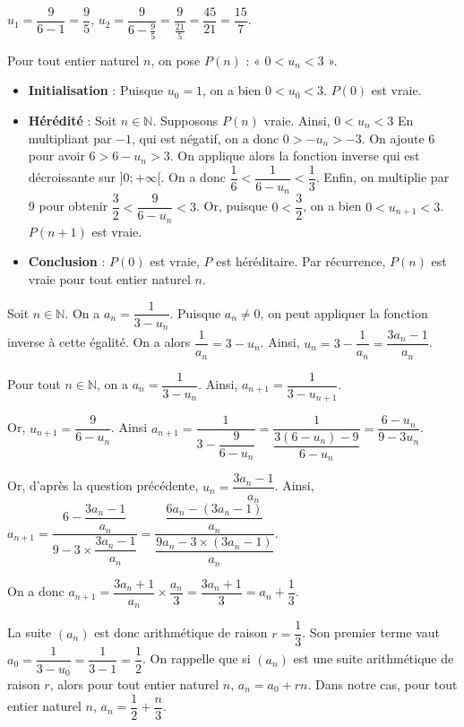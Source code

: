 \documentclass[11pt,fleqn]{book} %
\begin{document}
\begin{solution}$u_1=\dfrac{9}{6-1}=\dfrac{9}{5}$, $u_2=\dfrac{9}{6-\frac{9}{5}}=\dfrac{9}{\frac{21}{5}}=\dfrac{45}{21}=\dfrac{15}{7}$.

Pour tout entier naturel $n$, on pose $P(n)$ : « $0<u_n<3$ ».

\begin{itemize}
\item \textbf{Initialisation }: Puisque $u_0=1$, on a bien $0<u_0<3$. $P(0)$ est vraie.
\item \textbf{Hérédité} : Soit $n\in\mathbb{N}$. Supposons $P(n)$ vraie. Ainsi, $0<u_n<3$
En multipliant par $-1$, qui est négatif, on a donc $0>-u_n>-3$. On ajoute 6 pour avoir $6>6-u_n>3$. On applique alors la fonction inverse qui est décroissante sur $]0;+\infty[$. On a donc $\dfrac{1}{6} < \dfrac{1}{6-u_n} <\dfrac{1}{3}$. Enfin, on multiplie par 9 pour obtenir $\dfrac{3}{2} < \dfrac{9}{6-u_n} <3$. Or, puisque $0<\dfrac{3}{2}$, on a bien $0<u_{n+1}<3$. $P(n+1)$ est vraie.
\item \textbf{Conclusion} : $P(0)$ est vraie, $P$ est héréditaire. Par récurrence, $P(n)$ est vraie pour tout entier naturel $n$.
\end{itemize} 
    
Soit $n\in\mathbb{N}$. On a $a_n=\dfrac{1}{3-u_n}$. Puisque $a_n \neq 0$, on peut appliquer la fonction inverse à cette égalité. On a alors $\dfrac{1}{a_n}=3-u_n$. Ainsi, $u_n=3-\dfrac{1}{a_n}=\dfrac{3a_n-1}{a_n}$.

Pour tout $n\in\mathbb{N}$, on a $a_n=\dfrac{1}{3-u_n}$. Ainsi, $a_{n+1}=\dfrac{1}{3-u_{n+1}}$.

Or, $u_{n+1}=\dfrac{9}{6-u_n}$. Ainsi $a_{n+1}=\dfrac{1}{3-\dfrac{9}{6-u_n}}=\dfrac{1}{\dfrac{3(6-u_n)-9}{6-u_n}}=\dfrac{6-u_n}{9-3u_n}$.

Or, d'après la question précédente, $u_n=\dfrac{3a_n-1}{a_n}$. Ainsi, $a_{n+1}=\dfrac{6-\dfrac{3a_n-1}{a_n}}{9-3\times \dfrac{3a_n-1}{a_n}}=\dfrac{\dfrac{6a_n-(3a_n-1)}{a_n}}{\dfrac{9a_n-3\times(3a_n-1)}{a_n}}$.

On a donc $a_{n+1}=\dfrac{3a_n+1}{a_n}\times \dfrac{a_n}{3}=\dfrac{3a_n+1}{3}=a_n+\dfrac{1}{3}$.

La suite $(a_n)$ est donc arithmétique de raison $r=\dfrac{1}{3}$. Son premier terme vaut $a_0=\dfrac{1}{3-u_0}=\dfrac{1}{3-1}=\dfrac{1}{2}$. On rappelle que si $(a_n)$ est une suite arithmétique de raison $r$, alors pour tout entier naturel $n$, $a_n=a_0+rn$. Dans notre cas, pour tout entier naturel $n$, $a_n=\dfrac{1}{2}+\dfrac{n}{3}$. 
        

\end{solution}
\end{document}
